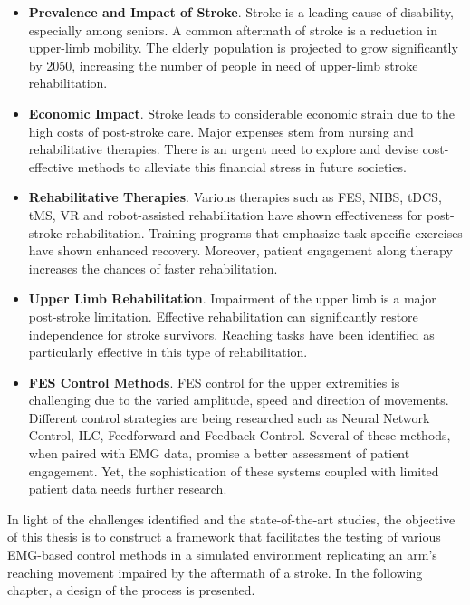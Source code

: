 \begin{itemize}
    \item \textbf{Prevalence and Impact of Stroke}. Stroke is a leading cause of disability, especially among seniors. A common aftermath of stroke is a reduction in upper-limb mobility. The elderly population is projected to grow significantly by 2050, increasing the number of people in need of upper-limb stroke rehabilitation.
    \item \textbf{Economic Impact}. Stroke leads to considerable economic strain due to the high costs of post-stroke care. Major expenses stem from nursing and rehabilitative therapies. There is an urgent need to explore and devise cost-effective methods to alleviate this financial stress in future societies.
    \item\textbf{Rehabilitative Therapies}. Various therapies such as FES, NIBS, tDCS, tMS, VR and robot-assisted rehabilitation have shown effectiveness for post-stroke rehabilitation. Training programs that emphasize task-specific exercises have shown enhanced recovery. Moreover, patient engagement along therapy increases the chances of faster rehabilitation.

    \item \textbf{Upper Limb Rehabilitation}. Impairment of the upper limb is a major post-stroke limitation. Effective rehabilitation can significantly restore independence for stroke survivors. Reaching tasks have been identified as particularly effective in this type of rehabilitation.


    \item\textbf{FES Control Methods}. FES control for the upper extremities is challenging due to the varied amplitude, speed and direction of movements. Different control strategies are being researched such as Neural Network Control, ILC, Feedforward and Feedback Control. Several of these methods, when paired with EMG data, promise a better assessment of patient engagement. Yet, the sophistication of these systems coupled with limited patient data needs further research.

\end{itemize}

In light of the challenges identified and the state-of-the-art studies, the objective of this thesis is to construct a framework that facilitates the testing of various EMG-based control methods in a simulated environment replicating an arm's reaching movement impaired by the aftermath of a stroke. In the following chapter, a design of the process is presented.